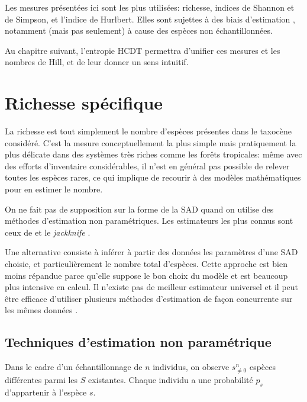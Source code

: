 \documentclass[
  11pt,
  french,
  a4paper,
  extrafontsizes,onecolumn,openright
  ]{memoir}
\begin{document}
Les mesures présentées ici sont les plus utilisées: richesse, indices de Shannon et de Simpson, et l'indice de Hurlbert.
Elles sont sujettes à des biais d'estimation \autocite{Mouillot1999}, notamment (mais pas seulement) à cause des espèces non échantillonnées.

Au chapitre suivant, l'entropie HCDT permettra d'unifier ces mesures et les nombres de Hill, et de leur donner un sens intuitif.

\hypertarget{sec-Richesse}{%
\section{Richesse spécifique}\label{sec-Richesse}}

La richesse est tout simplement le nombre d'espèces présentes dans le taxocène considéré.
C'est la mesure conceptuellement la plus simple mais pratiquement la plus délicate dans des systèmes très riches comme les forêts tropicales: même avec des efforts d'inventaire considérables, il n'est en général pas possible de relever toutes les espèces rares, ce qui implique de recourir à des modèles mathématiques pour en estimer le nombre.

On ne fait pas de supposition sur la forme de la SAD quand on utilise des méthodes d'estimation non paramétriques.
Les estimateurs les plus connus sont ceux de \textcite{Chao1984} et le \emph{jackknife} \autocite{Burnham1979}.

Une alternative consiste à inférer à partir des données les paramètres d'une SAD choisie, et particulièrement le nombre total d'espèces.
Cette approche est bien moins répandue parce qu'elle suppose le bon choix du modèle et est beaucoup plus intensive en calcul.
Il n'existe pas de meilleur estimateur universel \autocite{OHara2005} et il peut être efficace d'utiliser plusieurs méthodes d'estimation de façon concurrente sur les mêmes données \autocite{Basset2012}.

\hypertarget{techniques-destimation-non-paramuxe9trique}{%
\subsection{Techniques d'estimation non paramétrique}\label{techniques-destimation-non-paramuxe9trique}}

Dans le cadre d'un échantillonnage de \(n\) individus, on observe \(s^{n}_{\ne 0}\) espèces différentes parmi les \(S\) existantes.
Chaque individu a une probabilité \(p_s\) d'appartenir à l'espèce \(s\).
\end{document}

